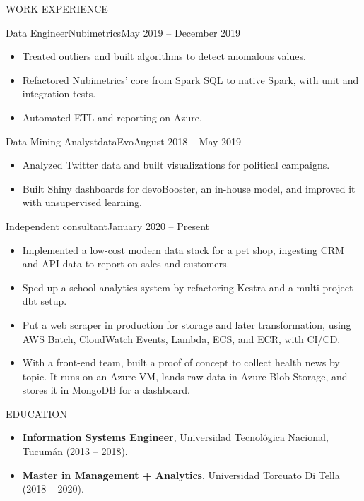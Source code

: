 \documentclass{mcdowellcv}
\begin{document}
\begin{cvsection}{WORK EXPERIENCE}
	\begin{cvsubsection}{Data Engineer}{Nubimetrics}{May 2019 -- December 2019}
		\begin{itemize}
			\item Treated outliers and built algorithms to detect anomalous values.
			\item Refactored Nubimetrics' core from Spark SQL to native Spark, with unit and integration tests.
			\item Automated ETL and reporting on Azure.
		\end{itemize}
	\end{cvsubsection}

	\begin{cvsubsection}{Data Mining Analyst}{dataEvo}{August 2018 -- May 2019}
		\begin{itemize}
			\item Analyzed Twitter data and built visualizations for political campaigns.
			\item Built Shiny dashboards for devoBooster, an in-house model, and improved it with unsupervised learning.
		\end{itemize}
	\end{cvsubsection}

	\begin{cvsubsection}{Independent consultant}{}{January 2020 -- Present}
		\begin{itemize}
			\item Implemented a low-cost modern data stack for a pet shop, ingesting CRM and API data to report on sales and customers.
			\item Sped up a school analytics system by refactoring Kestra and a multi-project dbt setup.
			\item Put a web scraper in production for storage and later transformation, using AWS Batch, CloudWatch Events, Lambda, ECS, and ECR, with CI/CD.
			\item With a front-end team, built a proof of concept to collect health news by topic. It runs on an Azure VM, lands raw data in Azure Blob Storage, and stores it in MongoDB for a dashboard.
		\end{itemize}
	\end{cvsubsection}

\end{cvsection}

\begin{cvsection}{EDUCATION}
	\begin{cvsubsection}{}{}{}
		\begin{itemize}
			\item \textbf{Information Systems Engineer}, Universidad Tecnológica Nacional, Tucumán (2013 -- 2018).
			\item \textbf{Master in Management + Analytics}, Universidad Torcuato Di Tella (2018 -- 2020).
		\end{itemize}
	\end{cvsubsection}
\end{cvsection}
\end{document}
